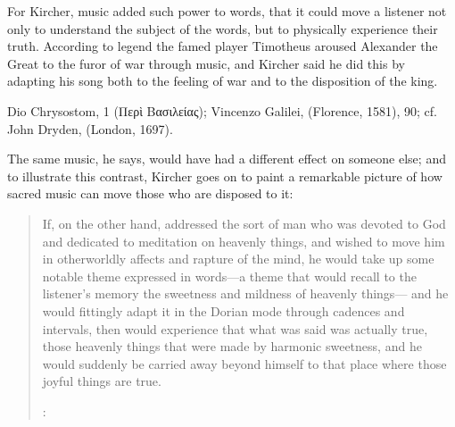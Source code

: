 For Kircher, music added such power to words, that it could move a listener not only to understand the subject of the words, but to physically experience their truth.
According to legend the famed  player Timotheus aroused Alexander the Great to the furor of war through music, and Kircher said he did this by adapting his song both to the feeling of war and to the disposition of the king.%
    \begin{Footnote}
        Dio Chrysostom,  1 (\textgreek{Περὶ Βασιλείας}); Vincenzo Galilei,  (Florence, 1581), 90; cf. John Dryden,  (London, 1697).\XXX
    \end{Footnote}
The same music, he says, would have had a different effect on someone else; and to illustrate this contrast, Kircher goes on to paint a remarkable picture of how sacred music can move those who are disposed to it:
\begin{quote}
    If, on the other hand,  addressed the sort of man who was devoted to God and dedicated to meditation on heavenly things,
    and wished to move him in otherworldly affects and rapture of the mind,
    he would take up some notable theme expressed in words---a theme that would recall to the listener's memory the sweetness and mildness of heavenly things---
    and he would fittingly adapt it in the Dorian mode through cadences and intervals,
    then  would experience that what was said was actually true,
    those heavenly things that were made by harmonic sweetness,
    and he would suddenly be carried away beyond himself to that place where those joyful things are true.%
    \begin{Footnote}
        \Autocite[bk.~7, 550 (emphasis added)]{Kircher:Musurgia}:
    \end{Footnote}
\end{quote}

